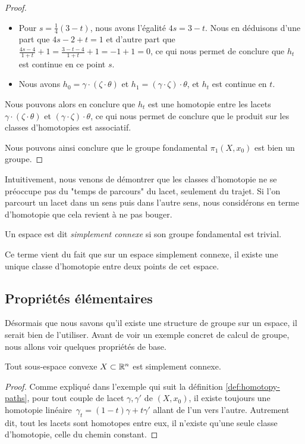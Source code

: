 \begin{proof}
\begin{enumerate}
\begin{itemize}
        \item Pour $s=\frac{1}{4}(3-t)$, nous avons l'égalité $4s=3-t$. Nous en déduisons d'une part que $4s-2+t=1$ et d'autre part que~${\frac{4s-4}{1+t}+1=\frac{3-t-4}{1+t}+1=-1+1=0}$, ce qui nous permet de conclure que $h_t$ est continue en ce point $s$.
        \item Nous avons $h_0=\gamma\cdot(\zeta\cdot\theta)$ et $h_1=(\gamma\cdot\zeta)\cdot\theta$, et $h_t$ est continue en $t$.
    \end{itemize}Nous pouvons alors en conclure que $h_t$ est une homotopie entre les lacets~$\gamma\cdot(\zeta\cdot\theta)$ et $(\gamma\cdot\zeta)\cdot\theta$, ce qui nous permet de conclure que le produit sur les classes d'homotopies est associatif.
\end{enumerate}Nous pouvons ainsi conclure que le groupe fondamental $\pi_1(X,x_0)$ est bien un groupe.
\end{proof}

Intuitivement, nous venons de démontrer que les classes d'homotopie ne se préoccupe pas du "temps de parcours" du lacet, seulement du trajet. Si l'on parcourt un lacet dans un sens puis dans l'autre sens, nous considérons en terme d'homotopie que cela revient à ne pas bouger.

\begin{definition}
Un espace est dit \emph{simplement connexe} si son groupe fondamental est trivial.
\end{definition}
Ce terme vient du fait que sur un espace simplement connexe, il existe une unique classe d'homotopie entre deux points de cet espace.

\subsection{Propriétés élémentaires}

Désormais que nous savons qu'il existe une structure de groupe sur un espace, il serait bien de l'utiliser. Avant de voir un exemple concret de calcul de groupe, nous allons voir quelques propriétés de base.

\begin{proposition}
Tout sous-espace convexe $X\subset\mathbb{R}^n$ est simplement connexe.
\end{proposition}
\begin{proof}
Comme expliqué dans l'exemple qui suit la définition \ref{def:homotopy-paths}, pour tout couple de lacet $\gamma,\gamma'$ de $(X,x_0)$, il existe toujours une homotopie linéaire~$\gamma_t=(1-t)\gamma+t\gamma'$ allant de l'un vers l'autre. Autrement dit, tout les lacets sont homotopes entre eux, il n'existe qu'une seule classe d'homotopie, celle du chemin constant.
\end{proof}

